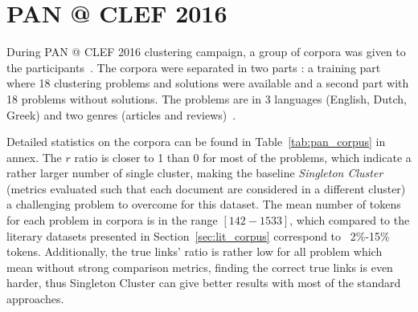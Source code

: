 \section{PAN @ CLEF 2016}

During PAN @ CLEF 2016 clustering campaign, a group of corpora was given to the participants~\cite{pan16_corpus}.
The corpora were separated in two parts : a training part where 18 clustering problems and solutions were available and a second part with 18 problems without solutions.
The problems are in 3 languages (English, Dutch, Greek) and two genres (articles and reviews)~\cite{pan16}.

Detailed statistics on the corpora can be found in Table~\ref{tab:pan_corpus} in annex.
The $r$ ratio is closer to 1 than 0 for most of the problems, which indicate a rather larger number of single cluster, making the baseline \textit{Singleton Cluster} (metrics evaluated such that each document are considered in a different cluster) a challenging problem to overcome for this dataset.
The mean number of tokens for each problem in corpora is in the range $[142-1533]$, which compared to the literary datasets presented in Section~\ref{sec:lit_corpus} correspond to ~2\%-15\% tokens.
Additionally, the true links' ratio is rather low for all problem which mean without strong comparison metrics, finding the correct true links is even harder, thus Singleton Cluster can give better results with most of the standard approaches.
